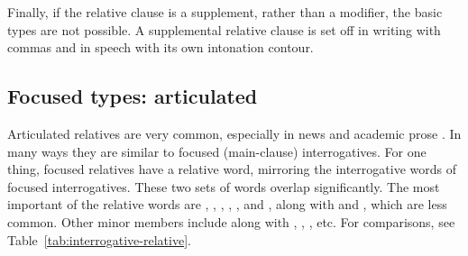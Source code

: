 \ea
    \z
\z
Finally, if the relative clause is a supplement, rather than a modifier, the basic types are not possible. A supplemental relative clause is set off in writing with commas and in speech with its own intonation contour.

\ea
    \z
\z
{}

\subsection{Focused types: articulated}\label{sec:focused-articulated}

Articulated relatives are very common, especially in news and academic prose \citep[610 \& 611]{Biber1999}. In many ways they are similar to focused (main-clause) interrogatives. For one thing, focused relatives have a relative word, mirroring the interrogative words of focused interrogatives. These two sets of words overlap significantly. The most important of the relative words are , , , , , and , along with  and , which are less common.  Other minor members include  along with , , , etc. For comparisons, see Table~\ref{tab:interrogative-relative}.


